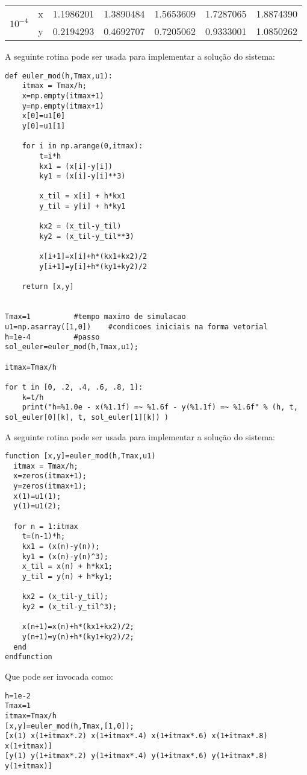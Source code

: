 \begin{resol}
\begin{center}
\begin{tabular}{|l|l|l|l|l|l|l|}
 
   \multirow{2}{*}{$10^{-4}$} &x  &1.1986201 &1.3890484 &1.5653609 &1.7287065 &1.8874390\\
			       &y&  0.2194293 &0.4692707 &0.7205062 &0.9333001 &1.0850262 \\			
   \hline
   \end{tabular}
\end{center}
\ifispython
A seguinte rotina pode ser usada para implementar a solução do sistema:
\begin{verbatim}
def euler_mod(h,Tmax,u1):
  	itmax = Tmax/h;
	x=np.empty(itmax+1)
	y=np.empty(itmax+1)
	x[0]=u1[0]
	y[0]=u1[1]

	for i in np.arange(0,itmax):
		t=i*h
		kx1 = (x[i]-y[i])
		ky1 = (x[i]-y[i]**3)

		x_til = x[i] + h*kx1
		y_til = y[i] + h*ky1

		kx2 = (x_til-y_til)
		ky2 = (x_til-y_til**3)

		x[i+1]=x[i]+h*(kx1+kx2)/2
		y[i+1]=y[i]+h*(ky1+ky2)/2

	return [x,y]


Tmax=1 			#tempo maximo de simulacao
u1=np.asarray([1,0])	#condicoes iniciais na forma vetorial
h=1e-4			#passo
sol_euler=euler_mod(h,Tmax,u1);

itmax=Tmax/h

for t in [0, .2, .4, .6, .8, 1]:
	k=t/h
	print("h=%1.0e - x(%1.1f) =~ %1.6f - y(%1.1f) =~ %1.6f" % (h, t, sol_euler[0][k], t, sol_euler[1][k]) )

\end{verbatim}
\fi

\ifisoctave
A seguinte rotina pode ser usada para implementar a solução do sistema:
\begin{verbatim}
function [x,y]=euler_mod(h,Tmax,u1)
  itmax = Tmax/h;
  x=zeros(itmax+1);
  y=zeros(itmax+1);
  x(1)=u1(1);
  y(1)=u1(2);
  
  for n = 1:itmax
    t=(n-1)*h;
    kx1 = (x(n)-y(n));
    ky1 = (x(n)-y(n)^3);
    x_til = x(n) + h*kx1;
    y_til = y(n) + h*ky1;
    
    kx2 = (x_til-y_til);
    ky2 = (x_til-y_til^3);

    x(n+1)=x(n)+h*(kx1+kx2)/2;
    y(n+1)=y(n)+h*(ky1+ky2)/2;
  end
endfunction 
\end{verbatim}
Que pode ser invocada como:
\begin{verbatim}
h=1e-2
Tmax=1
itmax=Tmax/h
[x,y]=euler_mod(h,Tmax,[1,0]);
[x(1) x(1+itmax*.2) x(1+itmax*.4) x(1+itmax*.6) x(1+itmax*.8) x(1+itmax)]
[y(1) y(1+itmax*.2) y(1+itmax*.4) y(1+itmax*.6) y(1+itmax*.8) y(1+itmax)]
 \end{verbatim}


\end{resol}
